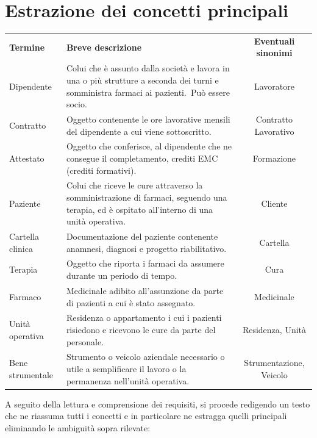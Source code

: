 \documentclass[a4paper, 12pt]{report}
\begin{document}
\section{Estrazione dei concetti principali}\label{sec:estrazione-dei-concetti-principali}
\begin{tabularx}{\textwidth}{lXc}
        \rowcolor{seaGreen}
        \textbf{Termine} & \textbf{Breve descrizione} & \textbf{Eventuali sinonimi} \\
        Dipendente & Colui che è assunto dalla società e lavora in una o più strutture a seconda dei turni e
        somministra farmaci ai pazienti.\ Può essere socio.\ & Lavoratore \\
        \hline
        Contratto & Oggetto contenente le ore lavorative mensili del dipendente a cui viene sottoscritto.\ & Contratto Lavorativo \\
        \hline
        Attestato & Oggetto che conferisce, al dipendente che ne consegue il completamento, crediti EMC (crediti formativi).\ & Formazione \\
        \hline
        Paziente & Colui che riceve le cure attraverso la somministrazione di farmaci, seguendo una terapia, ed è ospitato
        all'interno di una unità operativa.\ & Cliente \\
        \hline
        Cartella clinica & Documentazione del paziente contenente anamnesi, diagnosi e progetto riabilitativo.\ & Cartella \\
        \hline
        Terapia & Oggetto che riporta i farmaci da assumere durante un periodo di tempo.\ & Cura \\
        \hline
        Farmaco & Medicinale adibito all'assunzione da parte di pazienti a cui è stato assegnato.\ & Medicinale \\
        \hline
        Unità operativa & Residenza o appartamento i cui i pazienti risiedono e ricevono le cure da parte del personale.\ & Residenza, Unità \\
        \hline
        Bene strumentale & Strumento o veicolo aziendale necessario o utile a semplificare il lavoro o la permanenza nell'unità operativa.\ & Strumentazione, Veicolo
\end{tabularx} \par
\bigskip \noindent
A seguito della lettura e comprensione dei requisiti, si procede redigendo un testo che ne 
riassuma tutti i concetti e in particolare ne estragga quelli principali eliminando le ambiguità 
sopra rilevate: \par
\smallskip
\end{document}
